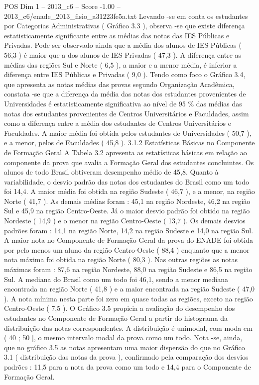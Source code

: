 \begin{textsample}{POS Dim 1 – 2013\_c6 – Score -1.00 – 2013\_c6/enade\_2013\_fisio\_a31223fe5a.txt}
Levando -se em conta os estudantes por Categorias Administrativas ( Gráfico 3.3 ), observa -se que existe diferença estatisticamente significante entre as médias das notas das IES Públicas e Privadas.
Pode ser observado ainda que a média dos alunos de IES Públicas ( 56,3 ) é maior que a dos alunos de IES Privadas ( 47,3 ).
A diferença entre as médias das regiões Sul e Norte ( 6,5 ), a maior e a menor média, é inferior a diferença entre IES Públicas e Privadas ( 9,0 ).
Tendo como foco o Gráfico 3.4, que apresenta as notas médias das provas segundo Organização Acadêmica, constata -se que a diferença da média das notas dos estudantes provenientes de Universidades é estatisticamente significativa ao nível de 95 \% das médias das notas dos estudantes provenientes de Centros Universitários e Faculdades, assim como a diferença entre a média dos estudantes de Centros Universitários e Faculdades.
A maior média foi obtida pelos estudantes de Universidades ( 50,7 ), e a menor, pelos de Faculdades ( 45,8 ). 3.1.2 Estatísticas Básicas no Componente de Formação Geral A Tabela 3.2 apresenta as estatísticas básicas em relação ao componente da prova que avalia a Formação Geral dos estudantes concluintes.
Os alunos de todo Brasil obtiveram desempenho médio de 45,8.
Quanto à variabilidade, o desvio padrão das notas dos estudantes do Brasil como um todo foi 14,4.
A maior média foi obtida na região Sudeste ( 46,7 ), e a menor, na região Norte ( 41,7 ).
As demais médias foram : 45,1 na região Nordeste, 46,2 na região Sul e 45,9 na região Centro-Oeste.
Já o maior desvio padrão foi obtido na região Nordeste ( 14,9 ) e o menor na região Centro-Oeste ( 13,7 ).
Os demais desvios padrões foram : 14,1 na região Norte, 14,2 na região Sudeste e 14,0 na região Sul.
A maior nota no Componente de Formação Geral da prova do ENADE foi obtida por pelo menos um aluno da região Centro-Oeste ( 88,4 ) enquanto que a menor nota máxima foi obtida na região Norte ( 80,3 ).
Nas outras regiões as notas máximas foram : 87,6 na região Nordeste, 88,0 na região Sudeste e 86,5 na região Sul.
A mediana do Brasil como um todo foi 46,1, sendo a menor mediana encontrada na região Norte ( 41,8 ) e a maior encontrada na região Sudeste ( 47,0 ).
A nota mínima nesta parte foi zero em quase todas as regiões, exceto na região Centro-Oeste ( 7,5 ).
O Gráfico 3.5 propicia a avaliação do desempenho dos estudantes no Componente de Formação Geral a partir do histograma da distribuição das notas correspondentes.
A distribuição é unimodal, com moda em ( 40 ; 50 ], o mesmo intervalo modal da prova como um todo.
Nota -se, ainda, que no gráfico 3.5 as notas apresentam uma maior dispersão do que no Gráfico 3.1 ( distribuição das notas da prova ), confirmado pela comparação dos desvios padrões : 11,5 para a nota da prova como um todo e 14,4 para o Componente de Formação Geral.

\end{textsample}
